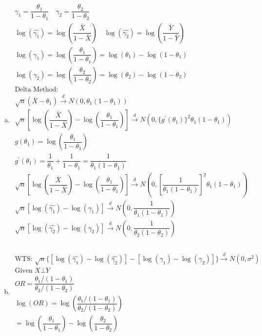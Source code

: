 \documentclass{article}
\newcommand{\cd}{\overset{d}{\to}}
\begin{document}
\begin{flushleft}
\begin{enumerate}[(a)]
	\item 
\begin{multline*}\\
\gamma_1=\dfrac{\theta_1}{1-\theta_1} \quad \gamma_2=\dfrac{\theta_2}{1-\theta_2}\\
\log(\hat{\gamma_1})=\log\left(\dfrac{\bar{X}}{1-\bar{X}}\right) \quad \log(\hat{\gamma_2})=\log\left(\dfrac{\bar{Y}}{1-\bar{Y}}\right)\\
\log(\gamma_1)=\log\left(\dfrac{\theta_1}{1-\theta_1}\right)=\log(\theta_1)-\log(1-\theta_1)\\
\log(\gamma_2)=\log\left(\dfrac{\theta_2}{1-\theta_2}\right)=\log(\theta_2)-\log(1-\theta_2)\\
\text{Delta Method:}\\
\sqrt{n}(\bar{X}-\theta_1)\cd N(0,\theta_1(1-\theta_1))\\
\sqrt{n}\left[\log\left(\dfrac{\bar{X}}{1-\bar{X}}\right)-\log\left(\dfrac{\theta_1}{1-\theta_1}\right)\right]\cd N(0,\{g^{'}(\theta_1)\}^2\theta_1(1-\theta_1))\\
g(\theta_1)=\log\left(\dfrac{\theta_1}{1-\theta_1}\right)\\
g^{'}(\theta_1)=\dfrac{1}{\theta_1}+\dfrac{1}{1-\theta_1}=\dfrac{1}{\theta_1(1-\theta_1)}\\
\sqrt{n}\left[\log\left(\dfrac{\bar{X}}{1-\bar{X}}\right)-\log\left(\dfrac{\theta_1}{1-\theta_1}\right)\right]\cd N\left(0,\left[\dfrac{1}{\theta_1(1-\theta_1)}\right]^2 \theta_1(1-\theta_1)\right)\\
\sqrt{n}[\log(\hat{\gamma_1})-\log(\gamma_1)]\cd N\left(0,\dfrac{1}{\theta_1(1-\theta_1)}\right)\\
\sqrt{n}[\log(\hat{\gamma_2})-\log(\gamma_2)]\cd N\left(0,\dfrac{1}{\theta_2(1-\theta_2)}\right)\\
\end{multline*}
	\item 
\begin{multline*}\\
\text{WTS: } \sqrt{n}\{[\log(\hat{\gamma_1})-\log(\hat{\gamma_2})]-[\log(\gamma_1)-\log(\gamma_2)]\}\cd N(0,\sigma^2)\\
\text{Given } X \bot Y\\
OR=\dfrac{\theta_1/(1-\theta_1)}{\theta_2/(1-\theta_2)}\\
\log(OR)=\log\left(\dfrac{\theta_1/(1-\theta_1)}{\theta_2/(1-\theta_2)}\right)\\
=\log\left(\dfrac{\theta_1}{1-\theta_1}\right)-\log\left(\dfrac{\theta_2}{1-\theta_2}\right)\\

\end{multline*}
\end{enumerate}
\end{flushleft}
\end{document}
